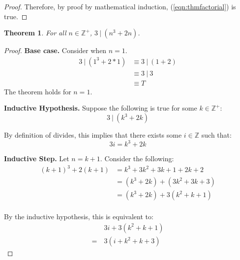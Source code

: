 \documentclass{article}
\newtheorem{theorem}{Theorem}
\numberwithin{subcase}{case}
\begin{document}
\begin{outline}[enumerate]
\begin{proof}
        Therefore, by proof by mathematical induction, (\ref{eqn:thmfactorial}) is true.

    \end{proof}

    \1 \begin{theorem}
        For all $n \in \mathbb{Z}^+$, $3\ |\ (n^3+2n)$.
        \label{thm:3divs}
    \end{theorem}

    \begin{proof}
        \textbf{Base case.} Consider when $n = 1$.
        \begin{equation}
            \begin{aligned}
                3\ |\ (1^3 + 2*1) &\equiv 3\ |\ (1 + 2)  \\
                &\equiv 3 \ | \ 3 \\
                &\equiv T
            \end{aligned}
        \end{equation}
        The theorem holds for $n = 1$.

        \textbf{Inductive Hypothesis.} Suppose the following is true for some $k \in \mathbb{Z}^+$:
        \begin{equation}
            3 \ | \ (k^3 + 2k)
        \end{equation}

        By definition of divides, this implies that there exists some $i \in \mathbb{Z}$ such that:
        \begin{equation}
            3i = k^3 + 2k
        \end{equation}

        \textbf{Inductive Step.} Let $n = k + 1$. Consider the following:
        \begin{equation}
            \begin{aligned}
                (k + 1)^3 + 2(k + 1) &= k^3 + 3k^2 + 3k + 1 + 2k + 2 \\
                &= (k^3 + 2k) + (3k^2 + 3k + 3) \\
                &= (k^3 + 2k) + 3(k^2 + k + 1) \\
            \end{aligned}
        \end{equation}

        By the inductive hypothesis, this is equivalent to:
        \begin{equation}
            \begin{aligned}
                &3i + 3(k^2 + k + 1) \\
                =\ &3(i + k^2 + k + 3) 
            \end{aligned}
        \end{equation}


\end{proof}
\end{outline}
\end{document}
